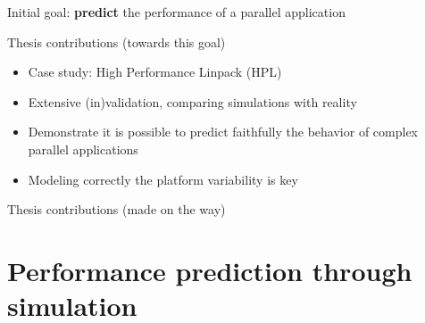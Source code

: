 \documentclass[10pt]{beamer}
\begin{document}
\begin{frame}[plain]
    \onslide<+->
    \begin{LARGE}
        Initial goal: \alert{\textbf{predict}} the performance of a parallel application
    \end{LARGE}
    \vfill
    \onslide<+->
    \begin{block}{Thesis contributions (towards this goal)}
        \begin{itemize}
            \item Case study: High Performance Linpack (HPL)
            \item Extensive (in)validation, comparing simulations with reality
            \item Demonstrate it is possible to \alert{predict faithfully} the behavior of complex parallel applications
            \item Modeling correctly the platform variability is key
        \end{itemize}
    \end{block}
    \onslide<+->
    \begin{block}{Thesis contributions (made on the way)}
    \end{block}
\end{frame}

\section{Performance prediction through simulation}%
\end{document}
